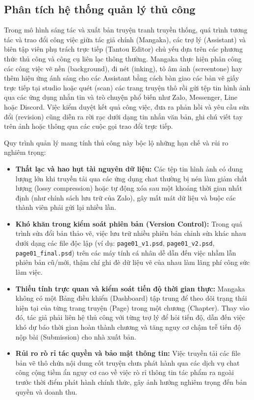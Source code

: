 \subsection{Phân tích hệ thống quản lý thủ công}
\label{subsec:quan_ly_thu_cong}
Trong mô hình sáng tác và xuất bản truyện tranh truyền thống, quá trình tương tác và trao đổi công việc giữa tác giả chính (Mangaka), các trợ lý (Assistant) và biên tập viên phụ trách trực tiếp (Tantou Editor) chủ yếu dựa trên các phương thức thủ công và công cụ liên lạc thông thường. Mangaka thực hiện phân công các công việc vẽ nền (background), đi nét (inking), tô âm ảnh (screentone) hay thêm hiệu ứng ánh sáng cho các Assistant bằng cách bàn giao các bản vẽ giấy trực tiếp tại studio hoặc quét (scan) các trang truyện thô rồi gửi tệp tin hình ảnh qua các ứng dụng nhắn tin và trò chuyện phổ biến như Zalo, Messenger, Line hoặc Discord. Việc kiểm duyệt kết quả công việc, đưa ra phản hồi và yêu cầu sửa đổi (revision) cũng diễn ra rời rạc dưới dạng tin nhắn văn bản, ghi chú viết tay trên ảnh hoặc thông qua các cuộc gọi trao đổi trực tiếp.

Quy trình quản lý mang tính thủ công này bộc lộ những hạn chế và rủi ro nghiêm trọng:
\begin{itemize}
    \item \textbf{Thất lạc và hao hụt tài nguyên dữ liệu:} Các tệp tin hình ảnh có dung lượng lớn khi truyền tải qua các ứng dụng chat thường bị nén làm giảm chất lượng (lossy compression) hoặc tự động xóa sau một khoảng thời gian nhất định (như chính sách lưu trữ của Zalo), gây mất mát dữ liệu và buộc các thành viên phải gửi lại nhiều lần.
    \item \textbf{Khó khăn trong kiểm soát phiên bản (Version Control):} Trong quá trình sửa đổi bản thảo vẽ, việc lưu trữ nhiều phiên bản chỉnh sửa khác nhau dưới dạng các file độc lập (ví dụ: \texttt{\small page01\_v1.psd}, \texttt{\small page01\_v2.psd}, \texttt{\small page01\_final.psd}) trên các máy tính cá nhân dễ dẫn đến việc nhầm lẫn phiên bản cũ/mới, thậm chí ghi đè dữ liệu vẽ của nhau làm lãng phí công sức làm việc.
    \item \textbf{Thiếu tính trực quan và kiểm soát tiến độ thời gian thực:} Mangaka không có một Bảng điều khiển (Dashboard) tập trung để theo dõi trạng thái hiện tại của từng trang truyện (Page) trong một chương (Chapter). Thay vào đó, tác giả phải liên hệ thủ công với từng trợ lý để hỏi tiến độ, dẫn đến việc khó dự báo thời gian hoàn thành chương và tăng nguy cơ chậm trễ tiến độ nộp bài (Submission) cho nhà xuất bản.
    \item \textbf{Rủi ro rò rỉ tác quyền và bảo mật thông tin:} Việc truyền tải các file bản vẽ thô chứa nội dung cốt truyện chưa phát hành qua các dịch vụ chat công cộng tiềm ẩn nguy cơ cao về việc rò rỉ thông tin tác phẩm ra ngoài trước thời điểm phát hành chính thức, gây ảnh hưởng nghiêm trọng đến bản quyền và doanh thu.
\end{itemize}


